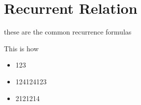 \documentclass{article}
\begin{document}
\section{Recurrent Relation}

 these are the common recurrence formulas

 This is how

\begin{itemize}
    \item 123
    \item 124124123
    \item 2121214
\end{itemize}
\end{document}

